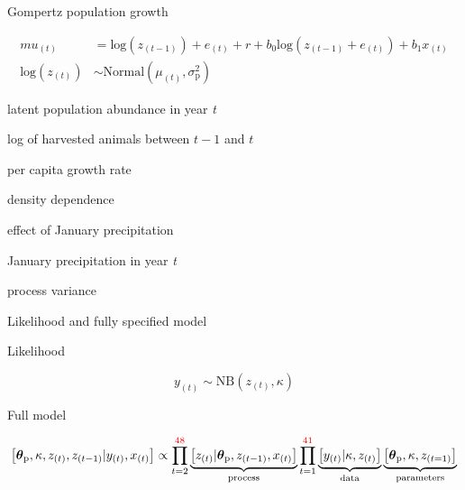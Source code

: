 \documentclass[14pt, compress, aspectratio=1610]{beamer}
\providecommand{\tightlist}{%
  \setlength{\itemsep}{0pt}\setlength{\parskip}{0pt}}
\begin{document}
\begin{frame}{%
\protect\hypertarget{gompertz-population-growth}{%
Gompertz population growth}}

\begin{align*}
mu_{(t)} &= \text{log}(z_{(t-1)}) + e_{(t)} + r + b_0 \text{log}(z_{(t-1)} + e_{(t)}) + b_1 x_{(t)} \\
\text{log}(z_{(t)}) &\sim \text{Normal}\left( \mu_{(t)}, \sigma^2_\text{p} \right)
\end{align*}

\footnotesize

\begin{description}
\tightlist
\item[\(z_t\)]
\alert{latent} population abundance in year \emph{t}
\item[\(e_t\)]
log of harvested animals between \(t-1\) and \(t\)
\item[\(r\)]
per capita growth rate
\item[\(b_0\)]
density dependence
\item[\(b_1\)]
effect of January precipitation
\item[\(x_t\)]
January precipitation in year \emph{t}
\item[\(\sigma^2_\text{p}\)]
process variance
\end{description}

\end{frame}

\begin{frame}{%
\protect\hypertarget{likelihood-and-fully-specified-model}{%
Likelihood and fully specified model}}

Likelihood

\[
 y_{(t)} \sim \text{NB} \left(  z_{(t)} , \kappa \right)
 \]

Full model

\small

\[
 \left[ \boldsymbol{\theta}_\text{p}, \kappa, z_{(t)}, z_{(t-1)} | y_{(t)}, x_{(t)} \right ] \propto \prod_{t=2}^{\textcolor{red}{48}} \underbrace{\left[ z_{(t)} | \boldsymbol{\theta}_\text{p}, z_{(t-1)}, x_{(t)} \right]}_{\text{process}} \prod_{t=1}^{\textcolor{red}{41}} \underbrace{\left[ y_{(t)} | \kappa, z_{(t)} \right]}_{\text{data}} \underbrace{\left[ \boldsymbol{\theta}_\text{p}, \kappa, z_{(t=1)}\right]}_{\text{parameters}}
 \]

\end{frame}
\end{document}
